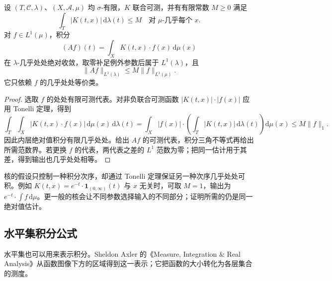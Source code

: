 \begin{proposition}\label{b1:prop:kernel-l1-estimate}
设 \((T,\mathcal C,\lambda)\)、\((X,\mathcal A,\mu)\) 均 \(\sigma\)-有限，\(K\) 联合可测，并有有限常数 \(M\geq0\) 满足
\[
\int_T|K(t,x)|\,\mathrm d\lambda(t)\leq M
\quad\text{对 }\mu\text{-几乎每个 }x.
\]
对 \(f\in L^1(\mu)\)，积分
\[
(Af)(t)=\int_XK(t,x)\cdot f(x)\,\mathrm d\mu(x)
\]
在 \(\lambda\)-几乎处处绝对收敛，取零补足例外参数后属于 \(L^1(\lambda)\)，且
\[
\|Af\|_{L^1(\lambda)}\leq M\|f\|_{L^1(\mu)}.
\]
它只依赖 \(f\) 的几乎处处等价类。
\end{proposition}
\begin{proof}
选取 \(f\) 的处处有限可测代表。对非负联合可测函数 \(|K(t,x)|\cdot|f(x)|\) 应用 Tonelli 定理，得到
\[
\int_T\int_X|K(t,x)\cdot f(x)|\,\mathrm d\mu(x)\,\mathrm d\lambda(t)
=\int_X|f(x)|\cdot\left(\int_T|K(t,x)|\,\mathrm d\lambda(t)\right)\mathrm d\mu(x)
\leq M\|f\|_1.
\]
因此内层绝对值积分有限几乎处处。给出 \(Af\) 的可测代表，积分三角不等式再给出所需范数界。若更换 \(f\) 的代表，两代表之差的 \(L^1\) 范数为零；把同一估计用于其差，得到输出也几乎处处相等。
\end{proof}

核的假设只控制一种积分次序，却通过 Tonelli 定理保证另一种次序几乎处处可积。例如 \(K(t,x)=e^{-t}\cdot\mathbf1_{(0,\infty)}(t)\) 与 \(x\) 无关时，可取 \(M=1\)，输出为 \(e^{-t}\cdot\int f\,\mathrm d\mu\)。更一般的核会让不同参数选择输入的不同部分；证明所需的仍是同一绝对值估计。

\subsection{水平集积分公式}
\label{b1:subsec:070404-layer-cake}

水平集也可以用来表示积分。Sheldon Axler 的《Measure, Integration \& Real Analysis》\cite[Section 5B]{Axler2020Measure}从函数图像下方的区域得到这一表示；它把函数的大小转化为各层集合的测度。

